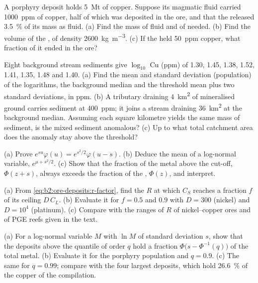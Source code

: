 \begin{exercise}[$\star\star$]\label{exo:b2:ore-deposits:8}
A porphyry deposit holds \qty{5}{Mt} of copper. Suppose its magmatic fluid carried \qty{1000}{ppm}
of copper, half of which was deposited in the ore, and that the  released \qty{3.5}{\percent}
of its mass as fluid. (a) Find the mass of fluid and of  needed. (b) Find the volume of the
, of density \qty{2600}{kg.m^{-3}}. (c) If the  held \qty{50}{ppm} copper, what fraction
of it ended in the ore?
\end{exercise}

\begin{exercise}[$\star\star$]\label{exo:b2:ore-deposits:9}
Eight background stream sediments give $\log_{10}$ Cu (ppm) of 1.30, 1.45, 1.38, 1.52, 1.41, 1.35,
1.48 and 1.40. (a) Find the mean and standard deviation (population) of the logarithms, the
background median and the threshold mean plus two standard deviations, in ppm. (b) A tributary
draining \qty{4}{km^2} of mineralised ground carries sediment at \qty{400}{ppm}; it joins a stream
draining \qty{36}{km^2} at the background median. Assuming each square kilometre yields the same
mass of sediment, is the mixed sediment anomalous? (c) Up to what total catchment area does the
anomaly stay above the threshold?
\end{exercise}

\begin{exercise}[$\star\star\star$]\label{exo:b2:ore-deposits:10}
(a) Prove $e^{su}\varphi(u) = e^{s^2/2}\varphi(u - s)$. (b) Deduce the mean of a log-normal
variable, $e^{\mu + s^2/2}$. (c) Show that the fraction of the metal above the cut-off,
$\Phi(z + s)$, always exceeds the fraction of the , $\Phi(z)$, and interpret.
\end{exercise}

\begin{exercise}[$\star\star\star$]\label{exo:b2:ore-deposits:11}
(a) From \eqref{eq:b2:ore-deposits:r-factor}, find the $R$ at which $C_S$ reaches a fraction $f$
of its ceiling $D\,C_L$. (b) Evaluate it for $f = 0.5$ and $0.9$ with $D = 300$ (nickel) and $D =
10^4$ (platinum). (c) Compare with the ranges of $R$ of nickel--copper ores and of PGE reefs given
in the text.
\end{exercise}

\begin{exercise}[$\star\star\star$]\label{exo:b2:ore-deposits:12}
(a) For a log-normal variable $M$ with $\ln M$ of standard deviation $s$, show that the deposits above
the quantile of order $q$ hold a fraction $\Phi\bigl(s - \Phi^{-1}(q)\bigr)$ of the total metal.
(b) Evaluate it for the porphyry population and $q = 0.9$. (c) The same for $q = 0.99$; compare with
the four largest deposits, which hold \qty{26.6}{\percent} of the copper of the compilation.
\end{exercise}

